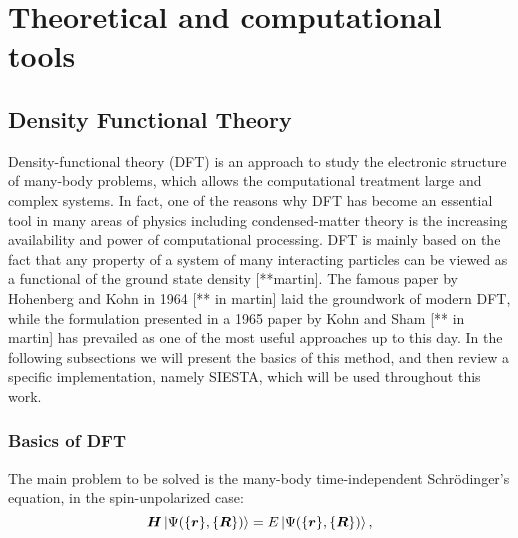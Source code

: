 
\chapter{Theoretical and computational tools} %

\label{Chapter1} %


\newcommand{\keyword}[1]{\textbf{#1}}
\newcommand{\tabhead}[1]{\textbf{#1}}
\newcommand{\code}[1]{\texttt{#1}}
\newcommand{\file}[1]{\texttt{\bfseries#1}}
\newcommand{\option}[1]{\texttt{\itshape#1}}

\section{Density Functional Theory}

Density-functional theory (DFT) is an approach to study the electronic structure of many-body problems, which allows the computational treatment large and complex systems. In fact, one of the reasons why DFT has become an essential tool in many areas of physics including condensed-matter theory is the increasing availability and power of computational processing. DFT is mainly based on the fact that any property of a system of many interacting particles can be viewed as a functional of the ground state
density [**martin]. The famous paper by Hohenberg and Kohn in 1964 [** in martin] laid the groundwork of modern DFT, while the formulation presented in a 1965 paper by Kohn and Sham [** in martin] has prevailed as one of the most useful approaches up to this day. In the following subsections we will present the basics of this method, and then review a specific implementation, namely SIESTA, which will be used throughout this work.


\subsection{Basics of DFT}
The main problem to be solved is the many-body time-independent Schrödinger's equation, in the spin-unpolarized case:
\begin{equation}
\bm H \ket{\Psi(\{\bm r\},\{\bm R\})} = E \ket{\Psi(\{\bm r\},\{\bm R\})},
\end{equation}

